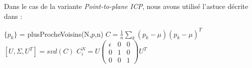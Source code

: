 Dans le cas de la variante \textit{Point-to-plane ICP}, nous avons utilisé l'astuce décrite dans \cite{bib_gicp} : \\


\begin{algorithm}[H]
$\{p_{k}\}$ = plusProcheVoisins(N,$p$,n)\;
$C = \frac{1}{n}\sum_{k}{(p_{k}-\mu)(p_{k}-\mu)^{T}}$\;
$[U,\Sigma,U^{T}] = svd(C)$\;
$C_{i}^{N} = U\begin{pmatrix}
\epsilon & 0 & 0\\
0 & 1 & 0\\
0 & 0 & 1
\end{pmatrix}U^{T}$
\end{algorithm}